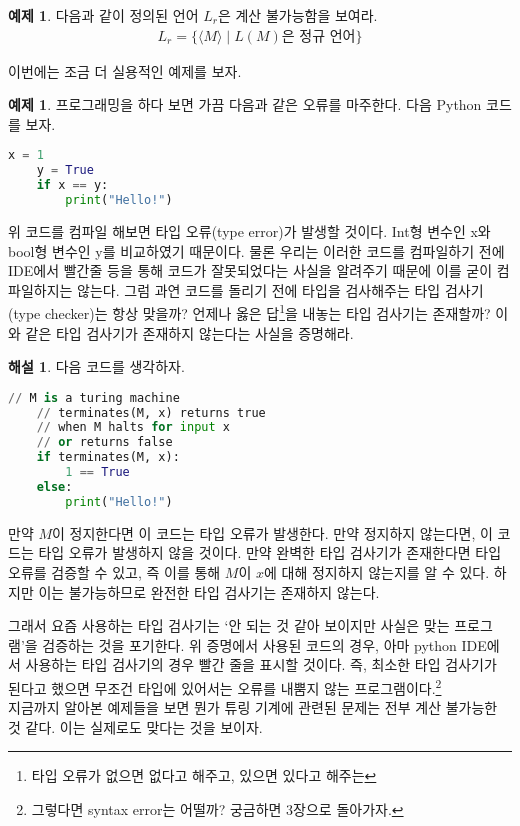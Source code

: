 \documentclass[b5paper, 11pt]{book}
\theoremstyle{definition}
\newtheorem{ex}[defn]{예제}
\newtheorem*{ans*}{해설}
\begin{document}
\begin{ex}
    다음과 같이 정의된 언어 $L_r$은 계산 불가능함을 보여라.
    \begin{align*}
        L_r = \{ \langle M \rangle \;\vert\; L(M) \text{은 정규 언어} \}
    \end{align*}
\end{ex}
이번에는 조금 더 실용적인 예제를 보자. 
\begin{ex}
    프로그래밍을 하다 보면 가끔 다음과 같은 오류를 마주한다. 다음 Python 코드를 보자.
\begin{lstlisting}[language=Python]
    x = 1 
    y = True
    if x == y:
        print("Hello!")
\end{lstlisting}
    위 코드를 컴파일 해보면 타입 오류(type error)가 발생할 것이다. Int형 변수인 x와 bool형 변수인 y를 비교하였기 때문이다. 물론 우리는 이러한 코드를 컴파일하기 전에 IDE에서 빨간줄 등을 통해 코드가 잘못되었다는 사실을 알려주기 때문에 이를 굳이 컴파일하지는 않는다. 그럼 과연 코드를 돌리기 전에 타입을 검사해주는 타입 검사기(type checker)는 항상 맞을까? 언제나 옳은 답\footnote{타입 오류가 없으면 없다고 해주고, 있으면 있다고 해주는}을 내놓는 타입 검사기는 존재할까? 이와 같은 타입 검사기가 존재하지 않는다는 사실을 증명해라. 
\end{ex}
\begin{ans*}
    다음 코드를 생각하자. 
\begin{lstlisting}[language=Python]
    // M is a turing machine
    // terminates(M, x) returns true 
    // when M halts for input x
    // or returns false 
    if terminates(M, x):
        1 == True 
    else:
        print("Hello!")
\end{lstlisting}
만약 $M$이 정지한다면 이 코드는 타입 오류가 발생한다. 만약 정지하지 않는다면, 이 코드는 타입 오류가 발생하지 않을 것이다. 만약 완벽한 타입 검사기가 존재한다면 타입 오류를 검증할 수 있고, 즉 이를 통해 $M$이 $x$에 대해 정지하지 않는지를 알 수 있다. 하지만 이는 불가능하므로 완전한 타입 검사기는 존재하지 않는다. 
\end{ans*}
그래서 요즘 사용하는 타입 검사기는 `안 되는 것 같아 보이지만 사실은 맞는 프로그램'을 검증하는 것을 포기한다. 위 증명에서 사용된 코드의 경우, 아마 python IDE에서 사용하는 타입 검사기의 경우 빨간 줄을 표시할 것이다. 즉, 최소한 타입 검사기가 된다고 했으면 무조건 타입에 있어서는 오류를 내뿜지 않는 프로그램이다.\footnote{그렇다면 syntax error는 어떨까? 궁금하면 3장으로 돌아가자.} \\
지금까지 알아본 예제들을 보면 뭔가 튜링 기계에 관련된 문제는 전부 계산 불가능한 것 같다. 이는 실제로도 맞다는 것을 보이자.
\end{document}

